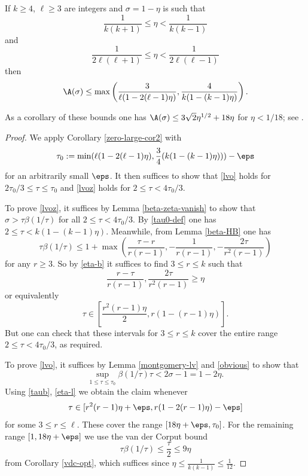 \begin{theorem}\label{pintz-density}\cite[Theorem 1]{pintz_density_2023}  If $k \geq 4$, $\ell \geq 3$ are integers and $\sigma = 1-\eta$ is such that
\begin{equation}\label{eta-b}
    \frac{1}{k(k+1)} \leq \eta < \frac{1}{k(k-1)}
\end{equation}
and
\begin{equation}\label{eta-l}
 \frac{1}{2\ell(\ell+1)} \leq \eta < \frac{1}{2\ell(\ell-1)}
\end{equation}
then
$$ \A(\sigma) \leq \max\left( \frac{3}{\ell(1-2(\ell-1)\eta)}, \frac{4}{k(1-(k-1)\eta)}\right).$$
\end{theorem}
\literature
{}

As a corollary of these bounds one has $\A(\sigma) \leq 3\sqrt{2} \eta^{1/2} + 18 \eta$ for $\eta < 1/18$; see \cite[Theorem 2']{pintz_density_2023}.

\begin{proof} We apply Corollary \ref{zero-large-cor2} with
\begin{equation}\label{tau0-def}
\tau_0 := \min( \ell (1 - 2(\ell-1) \eta), \frac{3}{4} (k(1-(k-1)\eta)) ) - \eps
\end{equation}
for an arbitrarily small $\eps$.
It then suffices to show that \eqref{lvo} holds for $2\tau_0/3 \leq \tau \leq \tau_0$ and \eqref{lvoz} holds for $2 \leq \tau < 4\tau_0/3$.

To prove \eqref{lvoz}, it suffices by Lemma \ref{beta-zeta-vanish} to show that $\sigma > \tau \beta(1/\tau)$ for all $2 \leq \tau < 4 \tau_0/3$.  By \eqref{tau0-def} one has $2 \leq \tau < k(1-(k-1)\eta)$.  Meanwhile, from Lemma \ref{beta-HB} one has
\begin{equation}\label{taub}
\tau \beta(1/\tau) \leq 1 + \max\left( \frac{\tau-r}{r(r-1)}, -\frac{1}{r(r-1)}, - \frac{2\tau}{r^2(r-1)}\right)
\end{equation}
for any $r \geq 3$.  So by \eqref{eta-b} it suffices to find $3 \leq r \leq k$ such that
$$ \frac{r-\tau}{r(r-1)}, \frac{2\tau}{r^2(r-1)} \geq \eta$$
or equivalently
$$ \tau \in [\frac{r^2(r-1)\eta}{2}, r(1-(r-1)\eta)].$$
But one can check that these intervals for $3 \leq r \leq k$ cover the entire range $2 \leq \tau < 4\tau_0/3$, as required.

To prove \eqref{lvo}, it suffices by Lemma \ref{montgomery-lv} and \eqref{obvious} to show that
$$ \sup_{1 \leq \tau \leq \tau_0} \beta(1/\tau) \tau < 2\sigma - 1 = 1 - 2 \eta.$$
Using \eqref{taub}, \eqref{eta-l} we obtain the claim whenever
$$ \tau \in [r^2(r-1)\eta+\eps, r(1-2(r-1)\eta)-\eps]$$
for some $3 \leq r \leq \ell$.  These cover the range $[18\eta+\eps, \tau_0]$.  For the remaining range $[1, 18\eta+\eps]$ we use the van der Corput bound
$$ \tau \beta(1/\tau) \leq \frac{\tau}{2} \leq 9 \eta$$
from Corollary \ref{vdc-opt}, which suffices since $\eta \leq \frac{1}{k(k-1)} \leq \frac{1}{12}$.
\end{proof}

